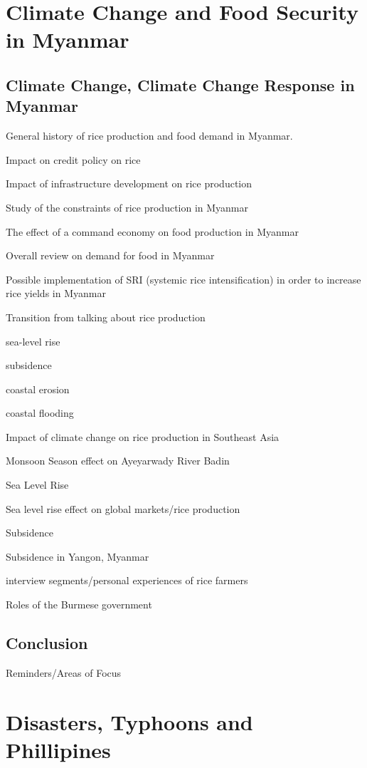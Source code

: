 \documentclass{book}\usepackage{knitr}
\begin{document}
\chapter{Climate Change and Food Security in Myanmar}



\section{Climate Change, Climate Change Response in Myanmar}


General history of rice production and food demand in Myanmar. 

Impact on credit policy on rice 

Impact of infrastructure development on rice production

Study of the constraints of rice production in Myanmar

The effect of a command economy on food production in Myanmar 

Overall review on demand for food in Myanmar 

Possible implementation of SRI (systemic rice intensification) in order to increase rice yields in Myanmar

Transition from talking about rice production

sea-level rise

subsidence

coastal erosion

coastal flooding

Impact of climate change on rice production in Southeast Asia

Monsoon Season effect on Ayeyarwady River Badin

Sea Level Rise 

Sea level rise effect on global markets/rice production


Subsidence

Subsidence in Yangon, Myanmar

interview segments/personal experiences of rice farmers


Roles of the Burmese government

\section{Conclusion}

Reminders/Areas of Focus




\chapter{Disasters, Typhoons and Phillipines}
\end{document}
